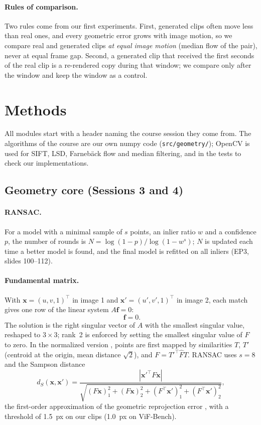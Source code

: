 \documentclass[11pt,a4paper]{article}
\newcommand{\x}{\mathbf{x}}
\begin{document}
\paragraph{Rules of comparison.}
Two rules come from our first experiments. First, generated clips often move less than real
ones, and every geometric error grows with image motion, so we compare real and generated
clips \emph{at equal image motion} (median flow of the pair), never at equal frame gap.
Second, a generated clip that received the first seconds of the real clip is a re-rendered
copy during that window; we compare only after the window and keep the window as a control.

\section{Methods}

All modules start with a header naming the course session they come from. The algorithms
of the course are our own numpy code (\texttt{src/geometry/}); OpenCV is used for SIFT, LSD,
Farneb\"ack flow and median filtering, and in the tests to check our implementations.

\subsection{Geometry core (Sessions 3 and 4)}

\paragraph{RANSAC.}
For a model with a minimal sample of $s$ points, an inlier ratio $w$ and a confidence $p$,
the number of rounds is $N=\log(1-p)/\log(1-w^{s})$; $N$ is updated each time a better
model is found, and the final model is refitted on all inliers (EP3, slides 100--112).

\paragraph{Fundamental matrix.}
With $\x=(u,v,1)^\top$ in image 1 and $\x'=(u',v',1)^\top$ in image 2, each match gives one
row of the linear system $A\mathbf{f}=0$:
\begin{equation}
  [\,u u',\; v u',\; u',\; u v',\; v v',\; v',\; u,\; v,\; 1\,]\;\mathbf{f}=0 .
\end{equation}
The solution is the right singular vector of $A$ with the smallest singular value, reshaped to
$3\times 3$; rank~2 is enforced by setting the smallest singular value of $F$ to zero. In the
normalized version \cite{hartley1997}, points are first mapped by similarities $T$, $T'$
(centroid at the origin, mean distance $\sqrt2$), and $F=T'^\top\hat F T$. RANSAC uses
$s=8$ and the Sampson distance
\begin{equation}
  d_S(\x,\x') = \frac{|\x'^\top F\x|}
  {\sqrt{(F\x)_1^2+(F\x)_2^2+(F^\top\x')_1^2+(F^\top\x')_2^2}},
\end{equation}
the first-order approximation of the geometric reprojection error \cite{hartley2004}, with
a threshold of 1.5~px on our clips (1.0~px on ViF-Bench).
\end{document}
